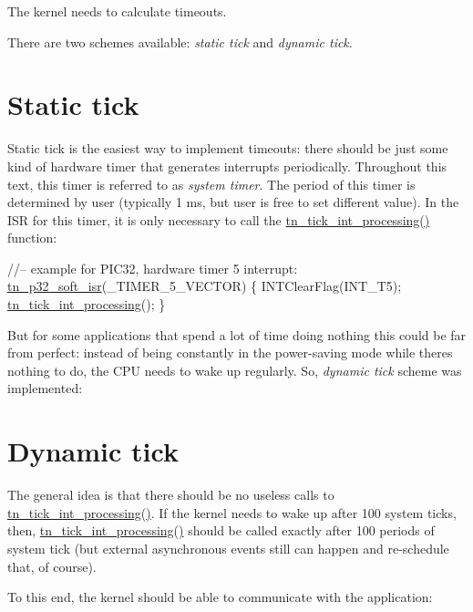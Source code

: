 The kernel needs to calculate timeouts.

There are two schemes available\+: {\itshape static tick} and {\itshape dynamic tick}.\hypertarget{time_ticks_time_ticks__static_tick}{}\section{Static tick}\label{time_ticks_time_ticks__static_tick}
Static tick is the easiest way to implement timeouts\+: there should be just some kind of hardware timer that generates interrupts periodically. Throughout this text, this timer is referred to as {\itshape system timer}. The period of this timer is determined by user (typically 1 ms, but user is free to set different value). In the I\+SR for this timer, it is only necessary to call the {\ttfamily \hyperlink{tn__sys_8h_aa44d297639e0520420890ef2bb7e2c1c}{tn\+\_\+tick\+\_\+int\+\_\+processing()}} function\+:


\begin{DoxyCode}
\textcolor{comment}{//-- example for PIC32, hardware timer 5 interrupt:}
\hyperlink{tn__arch__pic32_8h_a02d853d8d573f928fb8da65ef0c2bc8e}{tn\_p32\_soft\_isr}(\_TIMER\_5\_VECTOR)
\{
   INTClearFlag(INT\_T5);
   \hyperlink{tn__sys_8h_aa44d297639e0520420890ef2bb7e2c1c}{tn\_tick\_int\_processing}();
\}
\end{DoxyCode}


But for some applications that spend a lot of time doing nothing this could be far from perfect\+: instead of being constantly in the power-\/saving mode while there\textquotesingle{}s nothing to do, the C\+PU needs to wake up regularly. So, {\itshape dynamic tick} scheme was implemented\+:\hypertarget{time_ticks_time_ticks__dynamic_tick}{}\section{Dynamic tick}\label{time_ticks_time_ticks__dynamic_tick}
The general idea is that there should be no useless calls to {\ttfamily \hyperlink{tn__sys_8h_aa44d297639e0520420890ef2bb7e2c1c}{tn\+\_\+tick\+\_\+int\+\_\+processing()}}. If the kernel needs to wake up after 100 system ticks, then, {\ttfamily \hyperlink{tn__sys_8h_aa44d297639e0520420890ef2bb7e2c1c}{tn\+\_\+tick\+\_\+int\+\_\+processing()}} should be called exactly after 100 periods of system tick (but external asynchronous events still can happen and re-\/schedule that, of course).

To this end, the kernel should be able to communicate with the application\+:


